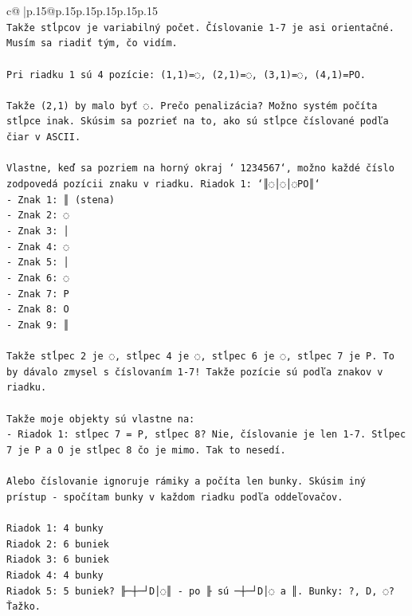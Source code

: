 \documentclass{article}
\begin{document}
{\begin{supertabular}{c@{$\;$}|p{.15\linewidth}@{}p{.15\linewidth}p{.15\linewidth}p{.15\linewidth}p{.15\linewidth}p{.15\linewidth}}
{{{\\ 
\texttt{Takže stĺpcov je variabilný počet. Číslovanie 1{-}7 je asi orientačné. Musím sa riadiť tým, čo vidím.} \\
\\ 
\texttt{Pri riadku 1 sú 4 pozície: (1,1)=◌, (2,1)=◌, (3,1)=◌, (4,1)=PO.} \\
\\ 
\texttt{Takže (2,1) by malo byť ◌. Prečo penalizácia? Možno systém počíta stĺpce inak. Skúsim sa pozrieť na to, ako sú stĺpce číslované podľa čiar v ASCII.} \\
\\ 
\texttt{Vlastne, keď sa pozriem na horný okraj ` 1234567`, možno každé číslo zodpovedá pozícii znaku v riadku. Riadok 1: `║◌│◌│◌PO║`} \\
\texttt{{-} Znak 1: ║ (stena)} \\
\texttt{{-} Znak 2: ◌} \\
\texttt{{-} Znak 3: │} \\
\texttt{{-} Znak 4: ◌} \\
\texttt{{-} Znak 5: │} \\
\texttt{{-} Znak 6: ◌} \\
\texttt{{-} Znak 7: P} \\
\texttt{{-} Znak 8: O} \\
\texttt{{-} Znak 9: ║} \\
\\ 
\texttt{Takže stĺpec 2 je ◌, stĺpec 4 je ◌, stĺpec 6 je ◌, stĺpec 7 je P. To by dávalo zmysel s číslovaním 1{-}7! Takže pozície sú podľa znakov v riadku. } \\
\\ 
\texttt{Takže moje objekty sú vlastne na:} \\
\texttt{{-} Riadok 1: stĺpec 7 = P, stĺpec 8? Nie, číslovanie je len 1{-}7. Stĺpec 7 je P a O je stĺpec 8 čo je mimo. Tak to nesedí.} \\
\\ 
\texttt{Alebo číslovanie ignoruje rámiky a počíta len bunky. Skúsim iný prístup {-} spočítam bunky v každom riadku podľa oddeľovačov.} \\
\\ 
\texttt{Riadok 1: 4 bunky} \\
\texttt{Riadok 2: 6 buniek} \\
\texttt{Riadok 3: 6 buniek} \\
\texttt{Riadok 4: 4 bunky} \\
\texttt{Riadok 5: 5 buniek? ╟─┼─┘D│◌║ {-} po ╟ sú ─┼─┘D│◌ a ║. Bunky: ?, D, ◌? Ťažko.} \\
}}}
\end{supertabular}}
\end{document}
